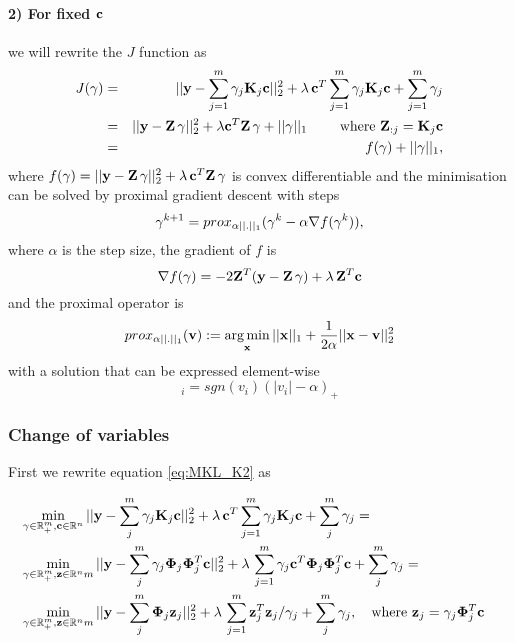 \paragraph{2) For fixed $\mathbf{c}$} we will rewrite the $J$ function as
\begin{eqnarray}\label{eq:MKLJ}
J(\mathbf{\gamma}) & = & ||\mathbf{y} - \sum_{j=1}^m \gamma_j \mathbf{K}_j \mathbf{c}||_2^2 +
\lambda \, \mathbf{c}^T \sum_{j=1}^m \gamma_j \mathbf{K}_j \mathbf{c} + \sum_{j=1}^m \gamma_j \nonumber \\
& = & ||\mathbf{y} - \mathbf{Z} \, \mathbf{\gamma} ||_2^2 + \lambda \mathbf{c}^T \mathbf{Z} \, \mathbf{\gamma} + ||\mathbf{\gamma}||_1 \qquad \text{ where } \mathbf{Z}_{:j} = \mathbf{K}_j \mathbf{c} \nonumber \\
& = & f(\mathbf{\gamma}) + ||\mathbf{\gamma}||_1,
\end{eqnarray}
where $f(\mathbf{\gamma}) = ||\mathbf{y} - \mathbf{Z} \, \mathbf{\gamma} ||_2^2 + \lambda \, \mathbf{c}^T \mathbf{Z} \, \mathbf{\gamma}$ is convex differentiable and the minimisation can be solved by proximal gradient descent with steps
\begin{equation}
\mathbf{\gamma}^{k+1} = prox_{\alpha ||.||_1}( \mathbf{\gamma}^{k} - \alpha \nabla f(\mathbf{\gamma}^{k})),
\end{equation}
where $\alpha$ is the step size, the gradient of $f$ is
\begin{equation}
\nabla f(\mathbf{\gamma}) = - 2 \mathbf{Z}^T (\mathbf{y} - \mathbf{Z} \, \mathbf{\gamma}) + \lambda \, \mathbf{Z}^T \mathbf{c}
\end{equation}
 and the proximal operator is
\begin{equation}
prox_{\alpha ||.||_1}( \mathbf{v} ) := \operatorname*{arg\,min}_{\mathbf{x}} ||\mathbf{x}||_1 + \frac{1}{2\alpha}||\mathbf{x}-\mathbf{v}||_2^2
\end{equation}
with a solution that can be expressed element-wise
\begin{equation}
[ prox_{\alpha ||.||_1}( \vc{v} ) ]_i = sgn(v_i) (|v_i| - \alpha)_+
\end{equation}

\subsubsection{Change of variables}
First we rewrite equation \eqref{eq:MKL_K2} as

\begin{eqnarray}\label{eq:MKL_Feat}
& \min_{\gamma \in \mathbb{R}^m_+, \mathbf{c} \in \mathbb{R}^n} 
||\mathbf{y} - \sum_{j}^m \gamma_j \mathbf{K}_j \mathbf{c}||_2^2 +
\lambda \, \mathbf{c}^T \sum_{j=1}^m \gamma_j \mathbf{K}_j \mathbf{c} + \sum_{j}^m \gamma_j = & \nonumber \\
& \min_{\gamma \in \mathbb{R}^m_+, \mathbf{z} \in \mathbb{R}^nm} 
||\mathbf{y} - \sum_{j}^m \gamma_j \mathbf{\Phi}_j \mathbf{\Phi}_j^T \mathbf{c}||_2^2 +
\lambda \, \sum_{j=1}^m \gamma_j \mathbf{c}^T \mathbf{\Phi}_j \mathbf{\Phi}_j^T \mathbf{c} + \sum_{j}^m \gamma_j = & \nonumber \\
& \min_{\gamma \in \mathbb{R}^m_+, \mathbf{z} \in \mathbb{R}^nm} 
||\mathbf{y} - \sum_{j}^m \mathbf{\Phi}_j \mathbf{z}_j||_2^2 +
\lambda \, \sum_{j=1}^m \mathbf{z}_j^T \mathbf{z}_j / \gamma_j
+ \sum_{j}^m \gamma_j, \quad \text{where } \mathbf{z}_j = \gamma_j \mathbf{\Phi}_j^T \mathbf{c} &
\end{eqnarray}

